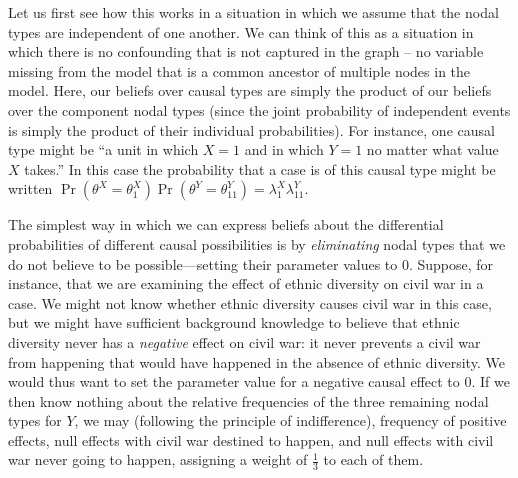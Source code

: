 \documentclass[12pt,]{book}
\begin{document}
Let us first see how this works in a situation in which we assume that the nodal types are independent of one another. We can think of this as a situation in which there is no confounding that is not captured in the graph -- no variable missing from the model that is a common ancestor of multiple nodes in the model. Here, our beliefs over causal types are simply the product of our beliefs over the component nodal types (since the joint probability of independent events is simply the product of their individual probabilities). For instance, one causal type might be ``a unit in which \(X=1\) and in which \(Y=1\) no matter what value \(X\) takes.'' In this case the probability that a case is of this causal type might be written \(\Pr(\theta^X = \theta^X_1)\Pr(\theta^Y = \theta^Y_{11}) = \lambda^X_1\lambda^Y_{11}\).

The simplest way in which we can express beliefs about the differential probabilities of different causal possibilities is by \emph{eliminating} nodal types that we do not believe to be possible---setting their parameter values to \(0\). Suppose, for instance, that we are examining the effect of ethnic diversity on civil war in a case. We might not know whether ethnic diversity causes civil war in this case, but we might have sufficient background knowledge to believe that ethnic diversity never has a \emph{negative} effect on civil war: it never prevents a civil war from happening that would have happened in the absence of ethnic diversity. We would thus want to set the parameter value for a negative causal effect to \(0\). If we then know nothing about the relative frequencies of the three remaining nodal types for \(Y\), we may (following the principle of indifference), frequency of positive effects, null effects with civil war destined to happen, and null effects with civil war never going to happen, assigning a weight of \(\frac{1}{3}\) to each of them.
\end{document}
